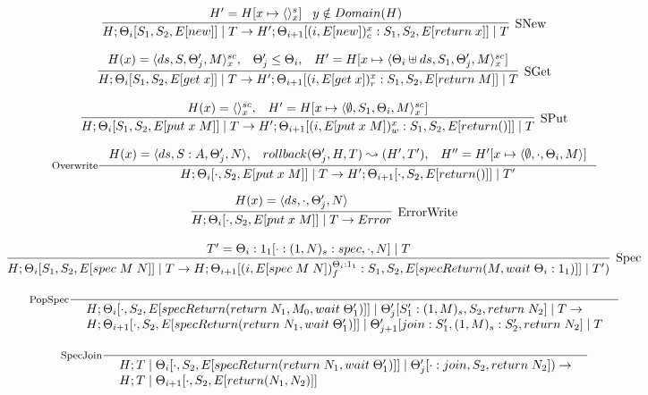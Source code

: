 \documentclass[9pt]{article}
\newcommand{\eval}[1]{E[#1]}
\begin{document}
\[%
\infer[\text{SNew}]{H; \Theta_i[S_1, S_2, \eval{new}] \; | \; T \rightarrow H';  \Theta_{i+1}[(i, \eval{new})_c^x : S_1, S_2, \eval{return \; x}] \; | \; T}{H' = H[x \mapsto \langle\rangle_x^s] \;\;\; y \notin Domain(H)}
\]

\[%
\infer[\text{SGet}]{H; \Theta_i[S_1, S_2, \eval{get \; x}] \; | \; T \rightarrow H'; \Theta_{i+1}[(i, \eval{get \; x})_r^x : S_1, S_2, \eval{return \; M}] \; | \; T}{H(x) = \langle ds, S, \Theta_j', M\rangle_x^{sc}, \;\;\; \Theta_j' \le \Theta_i, \;\;\; H' = H[x \mapsto \langle \Theta_i \uplus ds, S_1, \Theta_j', M\rangle_x^{sc}]}
\]

\[%
\infer[\text{SPut}]{H; \Theta_i[S_1, S_2, \eval{put \; x \; M}] \; | \; T \rightarrow H'; \Theta_{i+1}[(i, \eval{put \; x \; M})_w^x : S_1, S_2, \eval{return()}] \; | \; T}{H(x) = \langle\rangle_x^{sc}, \;\;\; H' = H[x \mapsto \langle \emptyset, S_1, \Theta_i, M\rangle_x^{sc}]}
\]

\[%
\inference[\text{Overwrite}]{H(x) = \langle ds, S:A, \Theta_j', N\rangle, \;\;\; rollback(\Theta_j', H, T) \leadsto (H', T'), \;\;\; H'' = H'[x\mapsto\langle \emptyset, \cdot, \Theta_i, M\rangle]}{H; \Theta_i[\cdot, S_2, \eval{put \; x \; M}] \; | \; T \rightarrow H'; \Theta_{i+1}[\cdot, S_2, \eval{return ()}] \; | \; T'}
\]

\[%
\infer[\text{ErrorWrite}]{H; \Theta_i[\cdot, S_2, \eval{put \; x \; M}] \; | \; T \rightarrow Error}{H(x) = \langle ds, \cdot, \Theta_j', N\rangle}
\]

\[ %
\infer[\text{Spec}]{H; \Theta_i[S_1, S_2, \eval{spec \; M \; N}] \; | \; T \rightarrow H; \Theta_{i+1}[(i, \eval{spec \; M \; N})_f^{\Theta_i : 1_1} : S_1, S_2, \eval{specReturn(M, wait \; \Theta_i : 1_1)}] \; | \; T')}{T' = \Theta_i : 1_1[\cdot : (1, N)_s : spec, \cdot, N] \; | \; T}
\]

\[%
\inference[\text{PopSpec}]{}{\begin{array}{l} H; \Theta_i[\cdot, S_2, \eval{specReturn(return \; N_1, M_0, wait \; \Theta_1')}]  \; | \; \Theta_j'[S_1' : (1, M)_s, S_2, return \; N_2] \; | \; T \rightarrow \\ H; \Theta_{i+1}[\cdot, S_2, \eval{specReturn(return \; N_1, wait \; \Theta_1')}] \; | \; \Theta_{j+1}'[join : S_1', (1, M)_s : S_2', return \; N_2] \; | \; T \end{array}}
\]

\[%
\inference[\text{SpecJoin}]{}{\begin{array}{l} H; T \; | \; \Theta_i[\cdot, S_2, \eval{specReturn(return \; N_1, wait \; \Theta_1')}] \; | \; \Theta_j'[\cdot : join, S_2, return \; N_2]) \rightarrow \\ H; T \; | \; \Theta_{i+1}[\cdot, S_2, \eval{return(N_1, N_2)}] \end{array}}
\]
\end{document}
